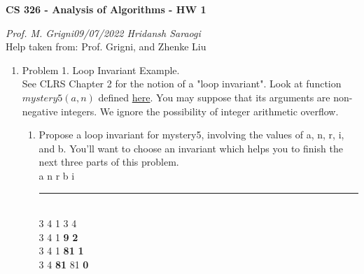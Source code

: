 \documentclass[11pt]{article}
\begin{document}
\begin{center}
    \textbf{CS 326 - Analysis of Algorithms - HW 1}\\
\end{center}


\begin{flushleft}
    \textit{Prof. M. Grigni\hfill09/07/2022 \hfill Hridansh Saraogi} \\
    \vspace{0.15cm}
    \small {Help taken from: Prof. Grigni, and Zhenke Liu}
\end{flushleft}


\begin{enumerate}

\item Problem 1. Loop Invariant Example. \\
See CLRS Chapter 2 for the notion of a "loop invariant". Look at function $mystery5(a,n)$ defined \href{https://cs.emory.edu/~mic/demos/mystery5.html}{here}. You may suppose that its arguments are non-negative integers. We ignore the possibility of integer arithmetic overflow.
    \begin{enumerate}
        \item Propose a loop invariant for mystery5, involving the values of a, n, r, i, and b. You'll want to choose an invariant which helps you to finish the next three parts of this problem.\\
        
        a \hspace{0.5cm} n \hspace{0.5cm} r \hspace{0.5cm} b \hspace{0.5cm} i
        \\\rule{4 cm}{2}\\
        3 \hspace{0.5cm} 4 \hspace{0.5cm} 1 \hspace{0.5cm} 3 \hspace{0.5cm} 4\\
        3 \hspace{0.5cm} 4 \hspace{0.5cm} 1 \hspace{0.5cm} \textbf{9} \hspace{0.5cm} \textbf{2}\\
        3 \hspace{0.5cm} 4 \hspace{0.5cm} 1 \hspace{0.5cm} \textbf{81} \hspace{0.3cm} \textbf{1}\\  
        3 \hspace{0.5cm} 4 \hspace{0.5cm} \textbf{81} \hspace{0.3cm} 81 \hspace{0.3cm} \textbf{0}\\  
        

\end{enumerate}
\end{enumerate}
\end{document}
